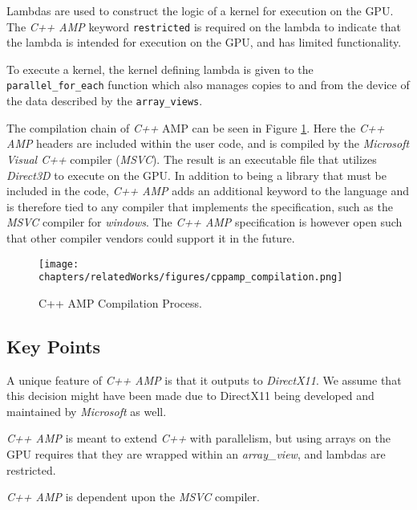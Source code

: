 Lambdas are used to construct the logic of a kernel for execution on the GPU. The \textit{C++ AMP} keyword \texttt{restricted} is required on the lambda to indicate that the lambda is intended for execution on the GPU, and has limited functionality. 

To execute a kernel, the kernel defining lambda is given to the \texttt{parallel\_for\_each} function which also manages copies to and from the device of the data described by the \texttt{array\_views}.

The compilation chain of \textit{C++} AMP can be seen in Figure \ref{fig:cppampCompilation}. Here the \textit{C++ AMP} headers are included within the user code, and is compiled by the \textit{Microsoft Visual C++} compiler (\textit{MSVC}). The result is an executable file that utilizes \textit{Direct3D} to execute on the GPU. In addition to being a library that must be included in the code, \textit{C++ AMP} adds an additional keyword to the language and is therefore tied to any compiler that implements the specification, such as the \textit{MSVC} compiler for \textit{windows}. The \textit{C++ AMP} specification is however open such that other compiler vendors could support it in the future.

\begin{figure}[H]
\center
\texttt{[image: chapters/relatedWorks/figures/cppamp\_compilation.png]}
\caption{C++ AMP Compilation Process.}
\label{fig:cppampCompilation}
\end{figure}

\subsection{Key Points}
A unique feature of \textit{C++ AMP} is that it outputs to \textit{DirectX11}. We assume that this decision might have been made due to DirectX11 being developed and maintained by \textit{Microsoft} as well.

\textit{C++ AMP} is meant to extend \textit{C++} with parallelism, but using arrays on the GPU requires that they are wrapped within an \textit{array\_view}, and lambdas are restricted. 

\textit{C++ AMP} is dependent upon the \textit{MSVC} compiler.
